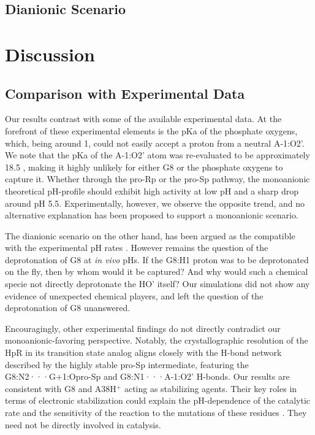 \documentclass[journal=jacsat,manuscript=article]{achemso}
\begin{document}
\subsection{Dianionic Scenario}

\section{Discussion}

\subsection{Comparison with Experimental Data}

Our results contrast with some of the available experimental data.
At the forefront of these experimental elements is the pKa of the phosphate oxygens,
which, being around 1, could not easily accept a proton from a neutral A-1:O2'.
We note that the pKa of the A-1:O2' atom was re-evaluated to be approximately 18.5 \cite{veenis_investigation_2021},
making it highly unlikely for either G8 or the phosphate oxygens to capture it.
Whether through the pro-Rp or the pro-Sp pathway, the monoanionic theoretical pH-profile
should exhibit high activity at low pH and a sharp drop around pH 5.5.
Experimentally, however, we observe the opposite trend,
and no alternative explanation has been proposed to support a monoanionic scenario.

The dianionic scenario on the other hand, has been argued 
as the compatible with the experimental pH rates \cite{kath-schorr_general_2012,wilson_hairpin_2011}. 
However remains the question of the deprotonation of G8 at \textit{in vivo} pHs. 
If the G8:H1 proton was to be deprotonated on the fly, then by whom would it be captured? 
And why would such a chemical specie not directly deprotonate the HO' itself? 
Our simulations did not show any evidence of unexpected chemical players, 
and left the question of the deprotonation of G8 unanswered.

Encouragingly, other experimental findings do not directly contradict our monoanionic-favoring perspective.
Notably, the crystallographic resolution of the HpR in its transition state analog \cite{torelli_comparison_2007}
aligns closely with the H-bond network described by the highly stable pro-Sp intermediate,
featuring the G8:N2···G+1:Opro-Sp and G8:N1···A-1:O2' H-bonds.
Our results are consistent with G8 and A38H$^+$ acting as stabilizing agents.
Their key roles in terms of electronic stabilization 
could explain the pH-dependence of the catalytic rate \cite{lebruska_rescue_2002, bevilacqua_mechanistic_2003, kuzmin_role_2004, nahas_observation_2004, wilson_nucleobase_2006, wilson_hairpin_2011} 
and the sensitivity of the reaction to the mutations of these residues \cite{mlynsky_extensive_2010, mlynsky_reactive_2015}. 
They need not be directly involved in catalysis.
\end{document}
